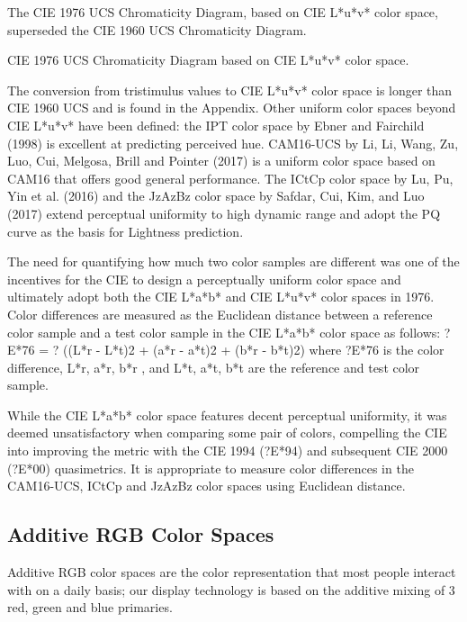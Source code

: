 The CIE 1976 UCS Chromaticity Diagram, based on CIE L*u*v* color space, superseded the CIE 1960 UCS Chromaticity Diagram.

CIE 1976 UCS Chromaticity Diagram based on CIE L*u*v* color space.

The conversion from tristimulus values to CIE L*u*v* color space is longer than CIE 1960 UCS and is found in the Appendix.
Other uniform color spaces beyond CIE L*u*v* have been defined: the IPT color space by Ebner and Fairchild (1998) is excellent at predicting perceived hue. CAM16-UCS by Li, Li, Wang, Zu, Luo, Cui, Melgosa, Brill and Pointer (2017) is a uniform color space based on CAM16 that offers good general performance. The ICtCp color space by Lu, Pu, Yin et al. (2016) and the JzAzBz color space by Safdar, Cui, Kim, and Luo (2017) extend perceptual uniformity to high dynamic range and adopt the PQ curve as the basis for Lightness prediction.

The need for quantifying how much two color samples are different was one of the incentives for the CIE to design a perceptually uniform color space and ultimately adopt both the CIE L*a*b* and CIE L*u*v* color spaces in 1976. Color differences are measured as the Euclidean distance between a reference color sample and a test color sample in the CIE L*a*b* color space as follows:
?E*76 = ? ((L*r - L*t)2 + (a*r - a*t)2  + (b*r - b*t)2)
where ?E*76 is the color difference, L*r, a*r, b*r , and L*t, a*t, b*t are the reference and test color sample.

While the CIE L*a*b* color space features decent perceptual uniformity, it was deemed unsatisfactory when comparing some pair of colors, compelling the CIE into improving the metric with the CIE 1994 (?E*94) and subsequent CIE 2000  (?E*00)  quasimetrics. It is appropriate to measure color differences in the CAM16-UCS, ICtCp and JzAzBz color spaces using Euclidean distance.

\subsection{Additive RGB Color Spaces}%
\label{subsec:additive-rgb-color-spaces}

Additive RGB color spaces are the color representation that most people interact with on a daily basis; our display technology is based on the additive mixing of 3 red, green and blue primaries.


